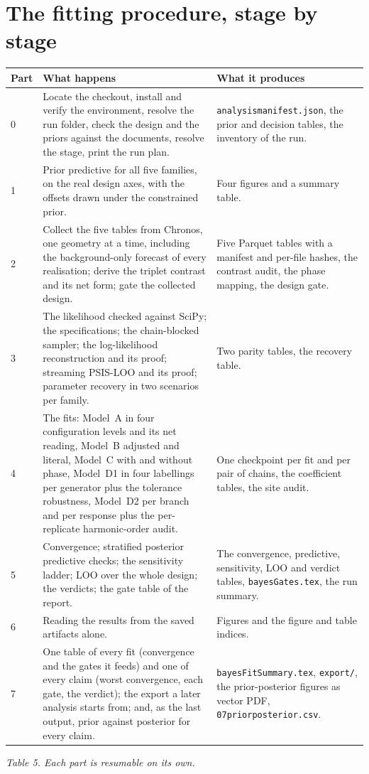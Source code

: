 \documentclass[10pt,a4paper]{article}
\newcommand{\code}[1]{\texttt{\UseBreakableUnderscores #1}}
\newcommand{\UseBreakableUnderscores}{\def\_{\textunderscore\allowbreak}}
\begin{document}
\section{The fitting procedure, stage by stage}
\begin{center}\small
\begin{tabularx}{\textwidth}{@{}L{0.8cm}YL{5.2cm}@{}}
\toprule
\textbf{Part} & \textbf{What happens} & \textbf{What it produces}\\
 & Locate the checkout, install and verify the environment, resolve the run folder, check the design and the priors against the documents, resolve the stage, print the run plan. & \code{analysis\_manifest.json}, the prior and decision tables, the inventory of the run.\\
1 & Prior predictive for all five families, on the real design axes, with the offsets drawn under the constrained prior. & Four figures and a summary table.\\
2 & Collect the five tables from Chronos, one geometry at a time, including the background-only forecast of every realisation; derive the triplet contrast and its net form; gate the collected design. & Five Parquet tables with a manifest and per-file hashes, the contrast audit, the phase mapping, the design gate.\\
3 & The likelihood checked against SciPy; the specifications; the chain-blocked sampler; the log-likelihood reconstruction and its proof; streaming PSIS-LOO and its proof; parameter recovery in two scenarios per family. & Two parity tables, the recovery table.\\
4 & The fits: Model~A in four configuration levels and its net reading, Model~B adjusted and literal, Model~C with and without phase, Model~D1 in four labellings per generator plus the tolerance robustness, Model~D2 per branch and per response plus the per-replicate harmonic-order audit. & One checkpoint per fit and per pair of chains, the coefficient tables, the site audit.\\
5 & Convergence; stratified posterior predictive checks; the sensitivity ladder; LOO over the whole design; the verdicts; the gate table of the report. & The convergence, predictive, sensitivity, LOO and verdict tables, \code{bayesGates.tex}, the run summary.\\
6 & Reading the results from the saved artifacts alone. & Figures and the figure and table indices.\\
7 & One table of every fit (convergence and the gates it feeds) and one of every claim (worst convergence, each gate, the verdict); the export a later analysis starts from; and, as the last output, prior against posterior for every claim. & \code{bayesFitSummary.tex}, \code{export/}, the prior-posterior figures as vector PDF, \code{07\_prior\_posterior.csv}.\\
\bottomrule
\end{tabularx}
\end{center}
{\small\itshape Table 5. Each part is resumable on its own.}
\end{document}
